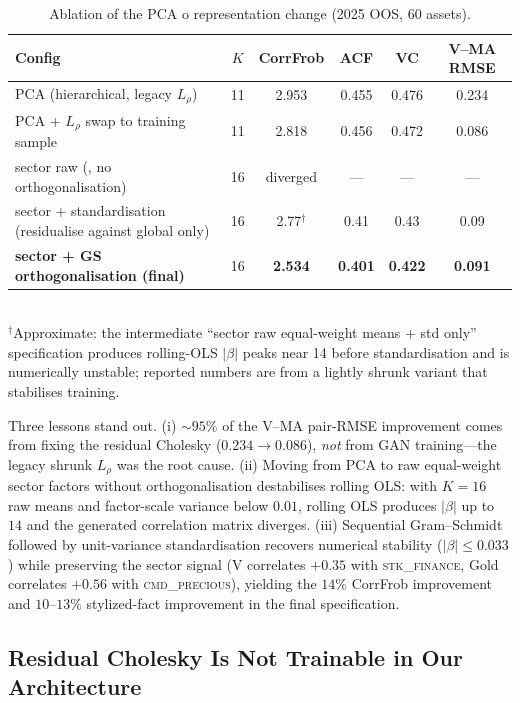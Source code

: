 \begin{table}[h]
\centering
\caption{Ablation of the PCA 	o representation change (2025 OOS, 60 assets).}
\label{tab:ablation}
\small
\begin{tabular}{lccccc}
\toprule
Config & $K$ & CorrFrob & ACF & VC & V--MA RMSE \\
\midrule
PCA (hierarchical, legacy $L_\rho$) & 11 & 2.953 & 0.455 & 0.476 & 0.234 \\
PCA + $L_\rho$ swap to training sample & 11 & 2.818 & 0.456 & 0.472 & 0.086 \\
sector raw (, no orthogonalisation) & 16 & diverged & --- & --- & --- \\
sector + standardisation (residualise against global only) & 16 & 2.77$^\dagger$ & 0.41 & 0.43 & 0.09 \\
\textbf{sector + GS orthogonalisation (final)} & 16 & \textbf{2.534} & \textbf{0.401} & \textbf{0.422} & \textbf{0.091} \\
\bottomrule
\end{tabular}
\\[2pt]
\footnotesize $^\dagger$Approximate: the intermediate ``sector raw equal-weight means + std only'' specification produces rolling-OLS $|\beta|$ peaks near 14 before standardisation and is numerically unstable; reported numbers are from a lightly shrunk variant that stabilises training.
\end{table}

Three lessons stand out. (i) $\sim 95\%$ of the V--MA pair-RMSE improvement comes from fixing the residual Cholesky ($0.234 \to 0.086$), \emph{not} from GAN training---the legacy shrunk $L_\rho$ was the root cause. (ii) Moving from PCA to raw equal-weight sector factors without orthogonalisation destabilises rolling OLS: with $K=16$ raw means and factor-scale variance below $0.01$, rolling OLS produces $|\beta|$ up to $14$ and the generated correlation matrix diverges. (iii) Sequential Gram--Schmidt followed by unit-variance standardisation recovers numerical stability ($|\beta| \le 0.033$) while preserving the sector signal (V correlates $+0.35$ with \textsc{stk\_finance}, Gold correlates $+0.56$ with \textsc{cmd\_precious}), yielding the $14\%$ CorrFrob improvement and $10$--$13\%$ stylized-fact improvement in the final specification.

\subsection{Residual Cholesky Is Not Trainable in Our Architecture}
\label{sec:L_rho_not_trainable}

